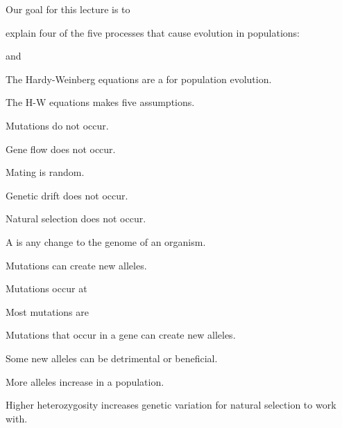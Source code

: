 \documentclass[t]{beamer}
\begin{document}
%
%
\begin{frame}{Our goal for this lecture is to }
	
	\hangpara explain four of the five processes that cause evolution in populations:
	
	\hangpara \quad {}

	\hangpara \quad {}
	 	 
	\hangpara \quad {} and
	
	\hangpara \quad {} 

\end{frame}
% 
\begin{frame}[t]{The Hardy-Weinberg equations are a  for population evolution.}
	
	\vspace{-\baselineskip}
	
	\hangpara The H-W equations makes five assumptions.
	
	\hangpara \quad Mutations do not occur.
		
	\hangpara \quad Gene flow does not occur.

	\hangpara \quad Mating is random.
	
	\hangpara \quad Genetic drift does not occur.
	
	\hangpara \quad Natural selection does not occur.
	
	\pause \hangpara {}
	
\end{frame}
%
{
\begin{frame}[t]{A  is any change to the genome of an organism.}

	\vfilll

	\hfill{}
\end{frame}
}
%
\begin{frame}[t]{Mutations can create new alleles.}

	\hangpara Mutations occur at \pause
	
	\hangpara Most mutations are \pause
	
	\hangpara Mutations that occur in a gene can create new alleles.\pause
	
	\hangpara Some new alleles can be detrimental or beneficial.\pause

	\hangpara More alleles increase  in a population.\pause
	
	\hangpara Higher heterozygosity increases genetic variation for natural selection to work with.
	
\end{frame}
\end{document}
